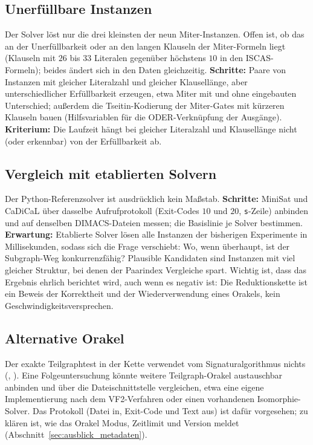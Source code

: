\subsection{Unerfüllbare Instanzen}

Der Solver löst nur die drei kleinsten der neun Miter-Instanzen. Offen ist, ob das an der Unerfüllbarkeit oder an den langen Klauseln der Miter-Formeln liegt (Klauseln mit $26$ bis $33$ Literalen gegenüber höchstens $10$ in den ISCAS-Formeln); beides ändert sich in den Daten gleichzeitig. \textbf{Schritte:} Paare von Instanzen mit gleicher Literalzahl und gleicher Klausellänge, aber unterschiedlicher Erfüllbarkeit erzeugen, etwa Miter mit und ohne eingebauten Unterschied; außerdem die Tseitin-Kodierung der Miter-Gates mit kürzeren Klauseln bauen (Hilfsvariablen für die ODER-Verknüpfung der Ausgänge). \textbf{Kriterium:} Die Laufzeit hängt bei gleicher Literalzahl und Klausellänge nicht (oder erkennbar) von der Erfüllbarkeit ab.

\subsection{Vergleich mit etablierten Solvern}

Der Python-Referenzsolver ist ausdrücklich kein Maßstab. \textbf{Schritte:} MiniSat und CaDiCaL über dasselbe Aufrufprotokoll (Exit-Codes $10$ und $20$, \texttt{s}-Zeile) anbinden und auf denselben DIMACS-Dateien messen; die Basislinie je Solver bestimmen. \textbf{Erwartung:} Etablierte Solver lösen alle Instanzen der bisherigen Experimente in Millisekunden, sodass sich die Frage verschiebt: Wo, wenn überhaupt, ist der Subgraph-Weg konkurrenzfähig? Plausible Kandidaten sind Instanzen mit viel gleicher Struktur, bei denen der Paarindex Vergleiche spart. Wichtig ist, dass das Ergebnis ehrlich berichtet wird, auch wenn es negativ ist: Die Reduktionskette ist ein Beweis der Korrektheit und der Wiederverwendung eines Orakels, kein Geschwindigkeitsversprechen.

\subsection{Alternative Orakel}

Der exakte Teilgraphtest in der Kette verwendet vom Signaturalgorithmus nichts (, ). Eine Folgeuntersuchung könnte weitere Teilgraph-Orakel austauschbar anbinden und über die Dateischnittstelle vergleichen, etwa eine eigene Implementierung nach dem VF2-Verfahren oder einen vorhandenen Isomorphie-Solver. Das Protokoll (Datei in, Exit-Code und Text aus) ist dafür vorgesehen; zu klären ist, wie das Orakel Modus, Zeitlimit und Version meldet (Abschnitt~\ref{sec:ausblick_metadaten}).

